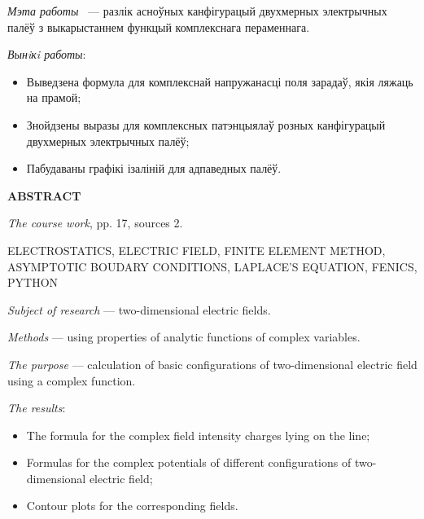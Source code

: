 \vspace{0.1cm}

\textit{Мэта работы} ~--- разлік асноўных канфігурацый двухмерных электрычных палёў з выкарыстаннем функцый комплекснага пераменнага.

\vspace{0.1cm}

\textit{Вынiкi работы}:
\begin{itemize}
\item Выведзена формула для комплекснай напружанасці поля зарадаў, якія ляжаць на прамой;
\item Знойдзены выразы для комплексных патэнцыялаў розных канфігурацый двухмерных электрычных палёў;
\item Пабудаваны графікі ізаліній для адпаведных палёў.
\end{itemize}

\newpage

\centerline{\textbf{ABSTRACT}}
\vspace{0.3cm}

\textit {The course work}, pp. 17, sources 2.

\vspace {0.1cm}

{ELECTROSTATICS, ELECTRIC FIELD, FINITE ELEMENT METHOD, ASYMPTOTIC BOUDARY CONDITIONS, LAPLACE'S EQUATION, FENICS, PYTHON }

\vspace {0.1cm}

\textit {Subject of research} --- two-dimensional electric fields.

\vspace {0.1cm}

\textit {Methods} --- using properties of analytic functions of complex variables.

\vspace {0.1cm}

\textit {The purpose} --- calculation of basic configurations of two-dimensional electric field using a complex function.

\vspace {0.1cm}

\textit {The results}:
\begin {itemize}
\item The formula for the complex field intensity charges lying on the line;
\item Formulas for the complex potentials of different configurations of two-dimensional electric field;
\item Contour plots for the corresponding fields.
\end {itemize}
